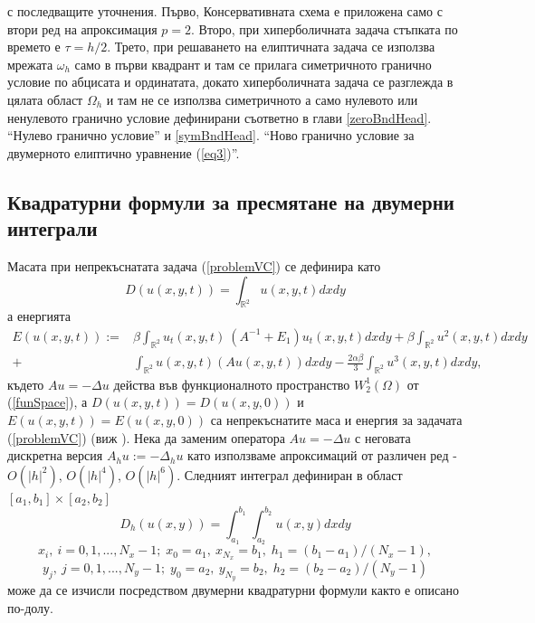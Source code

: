 \documentclass[a4paper]{article}
\newcommand{\rf}[1]{(\ref{#1})}
\newcommand{\RR}{\mathbb{R}}
\theoremstyle{remark}
\begin{document}
с последващите уточнения. Първо, Консервативната схема е приложена само с втори ред на апроксимация  $p=2$. Второ, при хиперболичната задача стъпката по времето е $\tau = h/2$. Трето, при решаването на елиптичната задача се използва мрежата $\omega_h$ само в първи квадрант и там се прилага симетричното гранично условие по абцисата и ординатата, докато хиперболичната задача се разглежда в цялата област $\Omega_h$ и там не се използва симетричното а само нулевото или ненулевото гранично условие дефинирани съответно в глави \ref{zeroBndHead}. ``Нулево гранично условие'' и \ref{symBndHead}. ``Ново гранично условие за двумерното елиптично уравнение \rf{eq3}''.

\subsection{Квадратурни формули за пресмятане на двумерни интеграли}\label{quadratureFormulas}

Масата при непрекъснатата задача \rf{problemVC} се дефинира като
\begin{equation}\label{intM}
D(u(x,y,t))=\int_{\RR^2} u(x,y,t)dx dy
\end{equation}
а енергията 
\begin{align}\label{ex-en}
E(u(x,y,t)):=&\beta \int_{\RR^2} u_t(x,y,t) \: \left(A^{-1}+E_1\right)u_t(x,y,t) dxdy+
\beta \int_{\RR^2} u^2(x,y,t) dxdy \nonumber\\
+& \int_{\RR^2}u(x,y,t) \left(A u(x,y,t)\right) dxdy
-\frac{2 \alpha \beta}{3} \int_{\RR^2} u^3(x,y,t) dxdy,
\end{align}
където $Au=-\Delta u$ действа във функционалното пространство $W^1_2(\Omega)$ от \rf{funSpace}, а $D(u(x,y,t)) = D(u(x,y,0))$ и $E(u(x,y,t)) = E(u(x,y,0))$ са непрекъснатите маса и енергия за задачата \rf{problemVC} (виж \cite{ref1}). Нека да заменим оператора $Au=-\Delta u$ с неговата дискретна версия $A_hu :=-\Delta_h u$ като използваме апроксимаций от различен ред - $O(|h|^2)$, $O(|h|^4)$, $O(|h|^6)$.
Следният интеграл дефиниран в област $[a_1, b_1] \times [a_2, b_2]$
\begin{equation}\label{int}
D_h(u(x,y))=\int_{a_1}^{b_1} \int_{a_2}^{b_2} u(x,y)dx dy
\end{equation}
$$x_i, ~i=0,1,...,N_x-1; \;x_0=a_1,~x_{N_x}=b_1, \;h_1=(b_1-a_1)/(N_x-1),$$
$$y_j, ~j=0,1,...,N_y-1; \; y_0=a_2,~y_{N_y}=b_2, \;h_2=(b_2-a_2)/(N_y-1)$$
може да се изчисли посредством двумерни квадратурни формули както е описано по-долу.
\end{document}
